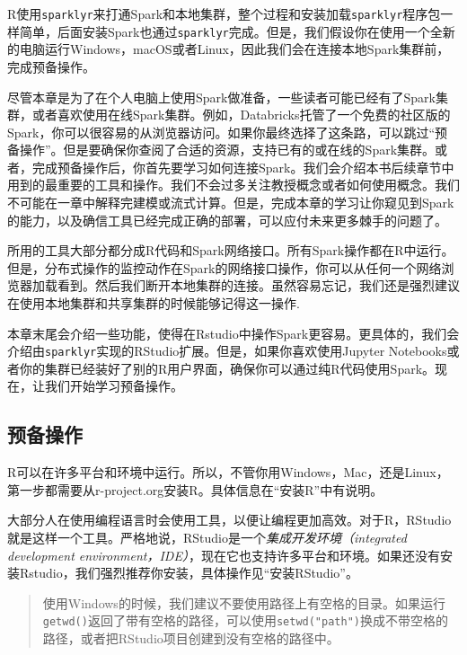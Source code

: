 \documentclass[
]{article}
\begin{document}
R使用\texttt{sparklyr}来打通Spark和本地集群，整个过程和安装加载\texttt{sparklyr}程序包一样简单，后面安装Spark也通过\texttt{sparklyr}完成。但是，我们假设你在使用一个全新的电脑运行Windows，macOS或者Linux，因此我们会在连接本地Spark集群前，完成预备操作。

尽管本章是为了在个人电脑上使用Spark做准备，一些读者可能已经有了Spark集群，或者喜欢使用在线Spark集群。例如，Databricks托管了一个免费的社区版的Spark，你可以很容易的从浏览器访问。如果你最终选择了这条路，可以跳过``预备操作''。但是要确保你查阅了合适的资源，支持已有的或在线的Spark集群。或者，完成预备操作后，你首先要学习如何连接Spark。我们会介绍本书后续章节中用到的最重要的工具和操作。我们不会过多关注教授概念或者如何使用概念。我们不可能在一章中解释完建模或流式计算。但是，完成本章的学习让你窥见到Spark的能力，以及确信工具已经完成正确的部署，可以应付未来更多棘手的问题了。

所用的工具大部分都分成R代码和Spark网络接口。所有Spark操作都在R中运行。但是，分布式操作的监控动作在Spark的网络接口操作，你可以从任何一个网络浏览器加载看到。然后我们断开本地集群的连接。虽然容易忘记，我们还是强烈建议在使用本地集群和共享集群的时候能够记得这一操作.

本章末尾会介绍一些功能，使得在Rstudio中操作Spark更容易。更具体的，我们会介绍由\texttt{sparklyr}实现的RStudio扩展。但是，如果你喜欢使用Jupyter
Notebooks或者你的集群已经装好了别的R用户界面，确保你可以通过纯R代码使用Spark。现在，让我们开始学习预备操作。

\hypertarget{ux9884ux5907ux64cdux4f5c}{%
\subsection{预备操作}\label{ux9884ux5907ux64cdux4f5c}}

R可以在许多平台和环境中运行。所以，不管你用Windows，Mac，还是Linux，第一步都需要从r-project.org安装R。具体信息在``安装R''中有说明。

大部分人在使用编程语言时会使用工具，以便让编程更加高效。对于R，RStudio就是这样一个工具。严格地说，RStudio是一个\emph{集成开发环境（integrated
development
environment，IDE）}，现在它也支持许多平台和环境。如果还没有安装Rstudio，我们强烈推荐你安装，具体操作见``安装RStudio''。

\begin{quote}
使用Windows的时候，我们建议不要使用路径上有空格的目录。如果运行\texttt{getwd()}返回了带有空格的路径，可以使用\texttt{setwd("path")}换成不带空格的路径，或者把RStudio项目创建到没有空格的路径中。
\end{quote}
\end{document}
